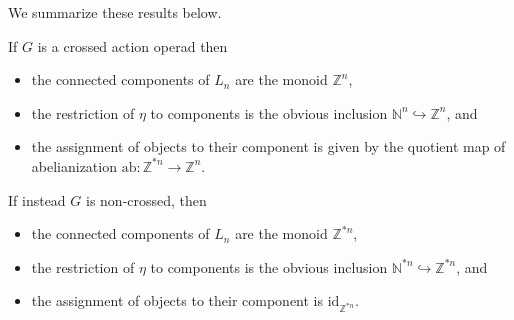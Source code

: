 \documentclass{amsbook} %
\newcommand{\ELn}{E\Lambda(\underline{n})}
\numberwithin{section}{chapter}
\begin{document}
We summarize these results below.
\begin{cor}\label{crossconcomp} If $G$ is a crossed action operad then
\begin{itemize} 
\item the connected components of $L_n$ are the monoid $\mathbb{Z}^n$,
\item the restriction of $\eta$ to components is the obvious inclusion $\mathbb{N}^n \hookrightarrow \mathbb{Z}^n$, and
\item the assignment of objects to their component is given by the quotient map of abelianization $\mathrm{ab}: \mathbb{Z}^{\ast n} \to \mathbb{Z}^n$.
\end{itemize}
If instead $G$ is non-crossed, then
\begin{itemize} \itemsep0em
\item the connected components of $L_n$ are the monoid $\mathbb{Z}^{\ast n}$,
\item the restriction of $\eta$ to components is the obvious inclusion $\mathbb{N}^{\ast n} \hookrightarrow \mathbb{Z}^{\ast n}$, and
\item the assignment of objects to their component is $\mathrm{id}_{\mathbb{Z}^{\ast n}}$.
\end{itemize}
\end{cor}
\end{document}
